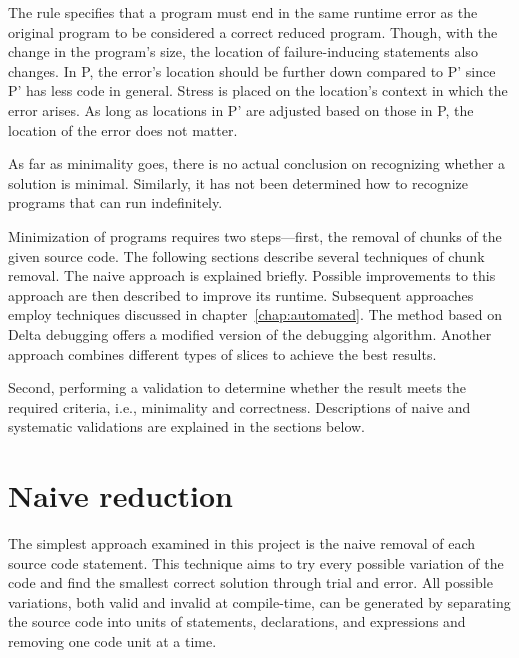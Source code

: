 The rule specifies that a program must end in the same runtime error 
as the original program to be considered a correct reduced program.
Though, with the change in the program's size, the location 
of failure-inducing statements also changes.
In P, the error's location should be further down compared to 
P' since P' has less code in general.
Stress is placed on the location's context in which the error arises.
As long as locations in P' are adjusted based on those in P, the 
location of the error does not matter.


As far as minimality goes, there is no actual conclusion on recognizing 
whether a solution is minimal.
Similarly, it has not been determined how to recognize programs that can 
run indefinitely.

Minimization of programs requires two steps—first, the removal of chunks 
of the given source code. 
The following sections describe several techniques of chunk removal. 
The naive approach is explained briefly. 
Possible improvements to this approach are then described to improve its 
runtime. 
Subsequent approaches employ techniques discussed in 
chapter~\ref{chap:automated}. 
The method based on Delta debugging offers a modified version of 
the debugging algorithm. 
Another approach combines different types of slices to achieve the best 
results.

Second, performing a validation to determine whether the result meets 
the required criteria, i.e., minimality and correctness. 
Descriptions of naive and systematic validations are explained in the 
sections below.

\section{Naive reduction}\label{chap:naive}

The simplest approach examined in this project is the naive removal of each 
source code statement.
This technique aims to try every possible variation of the code and find 
the smallest correct solution through trial and error.
All possible variations, both valid and invalid at compile-time, can be 
generated by separating the source code into units of statements, 
declarations, and expressions and removing one code unit at a time.

